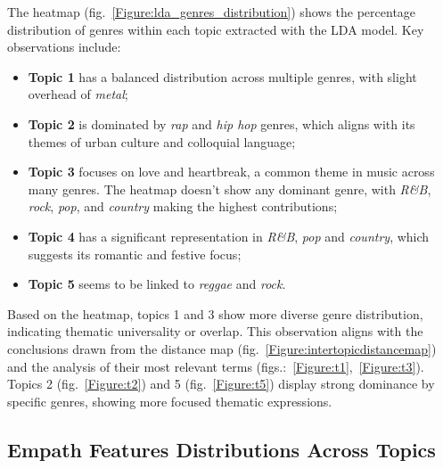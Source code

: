 The heatmap (fig.~\ref{Figure:lda_genres_distribution}) shows the percentage
distribution of genres within each topic extracted with the LDA model. Key
observations include:

\begin{itemize}
  \item \textbf{Topic 1} has a balanced distribution across multiple genres,
    with slight overhead of \textit{metal};
  \item \textbf{Topic 2} is dominated by \textit{rap} and \textit{hip hop}
    genres, which aligns with its themes of urban culture and colloquial
    language;
  \item \textbf{Topic 3} focuses on love and heartbreak, a common theme in
    music across many genres. The heatmap doesn't show any dominant genre, with
    \textit{R\&B}, \textit{rock}, \textit{pop}, and \textit{country} making the
    highest contributions;
  \item \textbf{Topic 4} has a significant representation in \textit{R\&B},
    \textit{pop} and \textit{country}, which suggests its romantic and festive
    focus;
  \item \textbf{Topic 5} seems to be linked to \textit{reggae} and
    \textit{rock}.
\end{itemize}

Based on the heatmap, topics 1 and 3 show more diverse genre distribution,
indicating thematic universality or overlap. This observation aligns with the
conclusions drawn from the  distance map
(fig.~\ref{Figure:intertopicdistancemap}) and the analysis of their most
relevant terms (figs.:~\ref{Figure:t1},~\ref{Figure:t3}). Topics 2
(fig.~\ref{Figure:t2}) and 5 (fig.~\ref{Figure:t5}) display strong dominance by
specific genres, showing more focused thematic expressions.


\subsection{Empath Features Distributions Across Topics}

